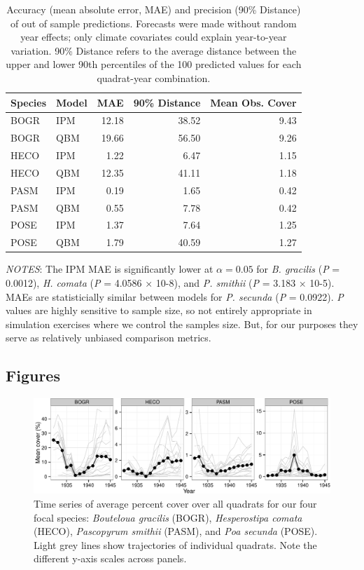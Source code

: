 \documentclass[12pt,]{article}
\begin{document}
\begin{table}[ht]
\centering
\caption{Accuracy (mean absolute error, MAE) and precision (90\% Distance) of out of sample predictions. Forecasts were made without random year effects; only climate covariates could explain year-to-year variation. 90\% Distance refers to the average distance between the upper and lower 90th percentiles of the 100 predicted values for each quadrat-year combination.} 
\begin{tabular}{llrrr}
  \hline
Species & Model & MAE & 90\% Distance & Mean Obs. Cover \\ 
  \hline
BOGR & IPM & 12.18 & 38.52 & 9.43 \\ 
  BOGR & QBM & 19.66 & 56.50 & 9.26 \\ 
  HECO & IPM & 1.22 & 6.47 & 1.15 \\ 
  HECO & QBM & 12.35 & 41.11 & 1.18 \\ 
  PASM & IPM & 0.19 & 1.65 & 0.42 \\ 
  PASM & QBM & 0.55 & 7.78 & 0.42 \\ 
  POSE & IPM & 1.37 & 7.64 & 1.25 \\ 
  POSE & QBM & 1.79 & 40.59 & 1.27 \\ 
   \hline
\end{tabular}
\end{table}

\emph{NOTES}: The IPM MAE is significantly lower at $\alpha=0.05$ for
\emph{B. gracilis} (\emph{P} = 0.0012), \emph{H. comata} (\emph{P} =
4.0586 × 10-8), and \emph{P. smithii} (\emph{P} = 3.183 × 10-5). MAEs
are statisticially similar between models for \emph{P. secunda}
(\emph{P} = 0.0922). \emph{P} values are highly sensitive to sample
size, so not entirely appropriate in simulation exercises where we
control the samples size. But, for our purposes they serve as relatively
unbiased comparison metrics.

\pagebreak{}

\pagebreak{}

\subsection{Figures}\label{figures}

\begin{figure}[htbp]
\centering
\includegraphics{components/figure/manuscript-figure_1.pdf}
\caption{Time series of average percent cover over all quadrats for our
four focal species: \emph{Bouteloua gracilis} (BOGR), \emph{Hesperostipa
comata} (HECO), \emph{Pascopyrum smithii} (PASM), and \emph{Poa secunda}
(POSE). Light grey lines show trajectories of individual quadrats. Note
the different y-axis scales across panels.}
\end{figure}
\end{document}
